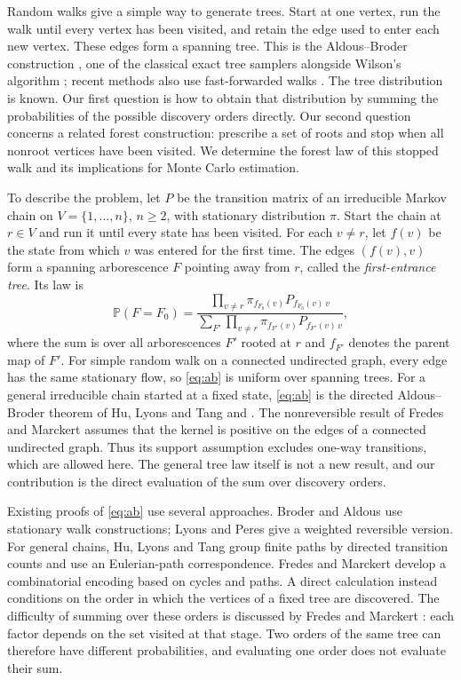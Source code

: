 \documentclass[onefignum,onetabnum]{siamart250211}
\numberwithin{theorem}{section}
\numberwithin{equation}{section}
\newcommand{\pr}{\mathbb{P}}
\begin{document}
Random walks give a simple way to generate trees. Start at one vertex,
run the walk until every vertex has been visited, and retain the edge
used to enter each new vertex. These edges form a spanning tree. This
is the Aldous--Broder construction \cite{Broder1989,Aldous1990}, one of
the classical exact tree samplers alongside Wilson's algorithm
\cite{Wilson1996,ProppWilson1998}; recent methods also use
fast-forwarded walks \cite{TamDunsonDuan2025}. The tree distribution is
known. Our first question is how to obtain that distribution by
summing the probabilities of the possible discovery orders directly.
Our second question concerns a related forest construction: prescribe
a set of roots and stop when all nonroot vertices have been visited.
We determine the forest law of this stopped walk and its implications
for Monte Carlo estimation.

To describe the problem, let $P$ be the transition matrix of an
irreducible Markov chain on $V=\{1,\dots,n\}$, $n\ge2$, with stationary
distribution $\pi$. Start the chain at $r\in V$ and run it until every
state has been visited. For each $v\ne r$, let $f(v)$ be the state from
which $v$ was entered for the first time. The edges $(f(v),v)$ form a
spanning arborescence $F$ pointing away from $r$, called the
\emph{first-entrance tree}. Its law is
\begin{equation}\label{eq:ab}
\pr(F=F_0)=\frac{\prod_{v\ne r}\pi_{f_{F_0}(v)}P_{f_{F_0}(v)\,v}}
{\sum_{F'}\prod_{v\ne r}\pi_{f_{F'}(v)}P_{f_{F'}(v)\,v}},
\end{equation}
where the sum is over all arborescences $F'$ rooted at $r$ and
$f_{F'}$ denotes the parent map of $F'$. For simple random walk on a
connected undirected graph, every edge has the same stationary flow,
so \eqref{eq:ab} is uniform over spanning trees. For a general
irreducible chain started at a fixed state, \eqref{eq:ab} is the
directed Aldous--Broder theorem of Hu, Lyons and Tang
\cite[Thm.~3.4]{HuLyonsTang2021} and \cite[Thm.~3]{FredesMarckert2023}. The nonreversible result of Fredes and Marckert
\cite[Thm.~3]{FredesMarckert2023} assumes that the kernel is
positive on the edges of a connected undirected graph. Thus its
support assumption excludes one-way transitions, which are allowed
here. The general tree law itself is not a new result, and our contribution
is the direct evaluation of the sum over discovery orders.

Existing proofs of \eqref{eq:ab} use several approaches. Broder
\cite{Broder1989} and Aldous \cite{Aldous1990} use stationary walk
constructions; Lyons and Peres \cite[Cor.~4.9]{LyonsPeres2016} give a
weighted reversible version. For general chains, Hu, Lyons and Tang
\cite{HuLyonsTang2021} group finite paths by directed transition counts
and use an Eulerian-path correspondence. Fredes and Marckert
\cite{FredesMarckert2023} develop a combinatorial encoding based on
cycles and paths. A direct calculation instead conditions on the
order in which the vertices of a fixed tree are discovered. The
difficulty of summing over these orders is discussed by Fredes and
Marckert \cite[\S1 and Remark~19]{FredesMarckert2023}: each factor
depends on the set visited at that stage. Two orders of the same tree
can therefore have different probabilities, and evaluating one order
does not evaluate their sum.
\end{document}
